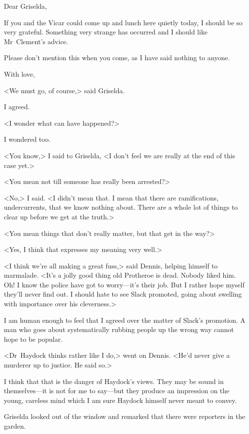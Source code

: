 \begin{mail}{}{Dear Griselda,}

If you and the Vicar could come up and lunch here quietly today, I should be so very grateful. Something very strange has occurred and I should like Mr~Clement's advice.

Please don't mention this when you come, as I have said nothing to anyone.

With love, 

\end{mail}

<We must go, of course,> said Griselda.

I agreed.

<I wonder what can have happened?>

I wondered too.

<You know,> I said to Griselda, <I don't feel we are really at the end of this case yet.>

<You mean not till someone has really been arrested?>

<No,> I said. <I didn't mean that. I mean that there are ramifications, undercurrents, that we know nothing about. There are a whole lot of things to clear up before we get at the truth.>

<You mean things that don't really matter, but that get in the way?>

<Yes, I think that expresses my meaning very well.>

<I think we're all making a great fuss,> said Dennis, helping himself to marmalade. <It's a jolly good thing old Protheroe is dead. Nobody liked him. Oh! I know the police have got to worry—it's their job. But I rather hope myself they'll never find out. I should hate to see Slack promoted, going about swelling with importance over his cleverness.>

I am human enough to feel that I agreed over the matter of Slack's promotion. A man who goes about systematically rubbing people up the wrong way cannot hope to be popular.

<Dr~Haydock thinks rather like I do,> went on Dennis. <He'd never give a murderer up to justice. He said so.>

I think that that is the danger of Haydock's views. They may be sound in themselves—it is not for me to say—but they produce an impression on the young, careless mind which I am sure Haydock himself never meant to convey.

Griselda looked out of the window and remarked that there were reporters in the garden.

